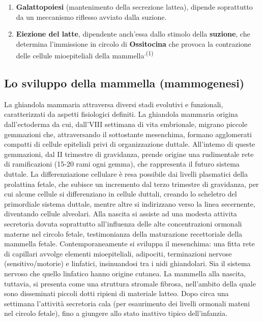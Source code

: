 \documentclass[]{article}
\begin{document}
\begin{enumerate}
\def\labelenumi{\arabic{enumi}.}
\setcounter{enumi}{2}
\item
  \textbf{Galattopoiesi} (mantenimento della secrezione lattea), dipende
  soprattutto da un meccanismo riflesso avviato dalla suzione.
\item
  \textbf{Eiezione del latte}, dipendente anch'essa dallo stimolo della
  \textbf{suzione}, che determina l'immissione in circolo di
  \textbf{Ossitocina} che provoca la contrazione delle cellule
  mioepiteliali della mammella\textsuperscript{.(1)}
\end{enumerate}

\hypertarget{lo-sviluppo-della-mammella-mammogenesi}{%
\subsection{Lo sviluppo della mammella
(mammogenesi)}\label{lo-sviluppo-della-mammella-mammogenesi}}

La ghiandola mammaria attraversa diversi stadi evolutivi e funzionali,
caratterizzati da aspetti fisiologici definiti. La ghiandola mammaria
origina dall'ectoderma da cui, dall'VIII settimana di vita embrionale,
migrano piccole gemmazioni che, attraversando il sottostante mesenchima,
formano agglomerati compatti di cellule epiteliali privi di
organizzazione duttale. All'intemo di queste gemmazioni, dal II
trimestre di gravidanza, prende origine una rudimentale rete di
ramificazioni (15-20 rami ogni gemma), che rappresenta il futuro sistema
duttale. La differenziazione cellulare è resa possibile dai livelli
plasmatici della prolattina fetale, che subisce un incremento dal terzo
trimestre di gravidanza, per cui alcune cellule si differenziano in
cellule duttali, creando lo scheletro del primordiale sistema duttale,
mentre altre si indirizzano verso la linea secernente, diventando
cellule alveolari. Alla nascita si assiste ad una modesta attivita
secretoria dovuta soprattutto all'influenza delle alte concentrazioni
ormonali materne nel circolo fetale, testimonianza della maturazione
recettoriale della mammella fetale. Contemporaneamente si sviluppa il
mesenchima: una fitta rete di capillari avvolge elementi mioepiteliali,
adipociti, terminazioni nervose (sensitivo/motorie) e linfatici,
insinuandosi tra i nidi ghiandolari. Sia il sistema nervoso che quello
linfatico hanno origine cutanea. La mammella alla nascita, tuttavia, si
presenta come una struttura stromale fibrosa, nell'ambito della quale
sono disseminati piccoli dotti ripieni di materiale latteo. Dopo circa
una settimana l'attività secretoria cala (per esaurimento dei livelli
ormonali mateni nel circolo fetale), fino a giungere allo stato inattivo
tipico dell'infanzia.
\end{document}
